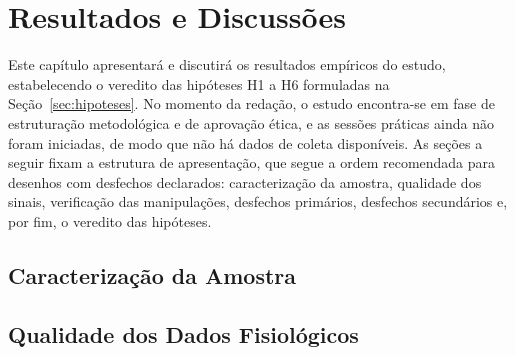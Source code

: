 \chapter{Resultados e Discussões}\label{cap:resultados}
\glsresetall


Este capítulo apresentará e discutirá os resultados empíricos do estudo, estabelecendo o veredito das hipóteses H1 a H6 formuladas na Seção~\ref{sec:hipoteses}. No momento da redação, o estudo encontra-se em fase de estruturação metodológica e de aprovação ética, e as sessões práticas ainda não foram iniciadas, de modo que não há dados de coleta disponíveis. As seções a seguir fixam a estrutura de apresentação, que segue a ordem recomendada para desenhos com desfechos declarados: caracterização da amostra, qualidade dos sinais, verificação das manipulações, desfechos primários, desfechos secundários e, por fim, o veredito das hipóteses.

\section{Caracterização da Amostra}\label{sec:res-amostra}


\section{Qualidade dos Dados Fisiológicos}\label{sec:res-qualidade}

